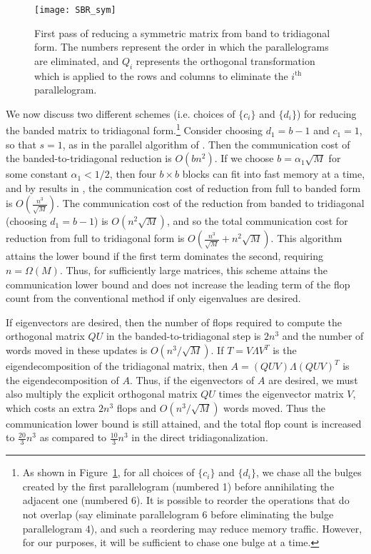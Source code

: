 \documentclass{article}
\def\lt{\left}
\def\rt{\right}
\theoremstyle{definition}
\begin{document}
\begin{figure}
\centering
\texttt{[image: SBR\_sym]}
\caption{First pass of reducing a symmetric matrix from band to tridiagonal form.  The numbers represent the order in which the parallelograms are eliminated, and $Q_i$ represents the orthogonal transformation which is applied to the rows and columns to eliminate the $i^\text{th}$ parallelogram.}
\label{fig:SBR_sym}
\end{figure}

We now discuss two different schemes (i.e. choices of $\{c_i\}$ and $\{d_i\}$) for reducing the banded matrix to tridiagonal form.\footnote{As shown in Figure~\ref{fig:SBR_sym}, for all choices of $\{c_i\}$ and $\{d_i\}$, we chase all the bulges created by the first parallelogram (numbered 1) before annihilating the adjacent one (numbered 6).  It is possible to reorder the operations that do not overlap (say eliminate parallelogram 6 before eliminating the bulge parallelogram 4), and such a reordering may reduce memory traffic.  However, for our purposes, it will be sufficient to chase one bulge at a time.}  Consider choosing $d_1=b-1$ and $c_1=1$, so that $s=1$, as in the parallel algorithm of \cite{lang}.  Then the communication cost of the banded-to-tridiagonal reduction is $O(bn^2)$.  If we choose $b=\alpha_1 \sqrt M$ for some constant $\alpha_1<1/2$, then four $b\times b$ blocks can fit into fast memory at a time, and by results in \cite{DGHL08}, the communication cost of reduction from full to banded form is $O\lt(\frac{n^3}{\sqrt M}\rt)$.  The communication cost of the reduction from banded to tridiagonal (choosing $d_1=b-1$) is $O(n^2\sqrt M)$, and so the total communication cost for reduction from full to tridiagonal form is $O\lt(\frac{n^3}{\sqrt M}+n^2\sqrt M\rt)$.  This algorithm attains the lower bound if the first term dominates the second, requiring $n=\Omega(M)$.  Thus, for sufficiently large matrices, this scheme attains the communication lower bound and does not increase the leading term of the flop count from the conventional method if only eigenvalues are desired.

If eigenvectors are desired, then the number of flops required to compute the orthogonal matrix $QU$ in the banded-to-tridiagonal step is $2n^3$ and the number of words moved in these updates is $O(n^3 / \sqrt M)$.  If $T=V\Lambda V^T$ is the eigendecomposition of the tridiagonal matrix, then $A=(QUV)\Lambda(QUV)^T$ is the eigendecomposition of $A$.  Thus, if the eigenvectors of $A$ are desired, we must also multiply the explicit orthogonal matrix $QU$ times the eigenvector matrix $V$, which costs an extra $2n^3$ flops and $O(n^3 / \sqrt M)$ words moved.  Thus the communication lower bound is still attained, and the total flop count is increased to $\frac{20}{3}n^3$ as compared to $\frac{10}{3}n^3$ in the direct tridiagonalization.
\end{document}

